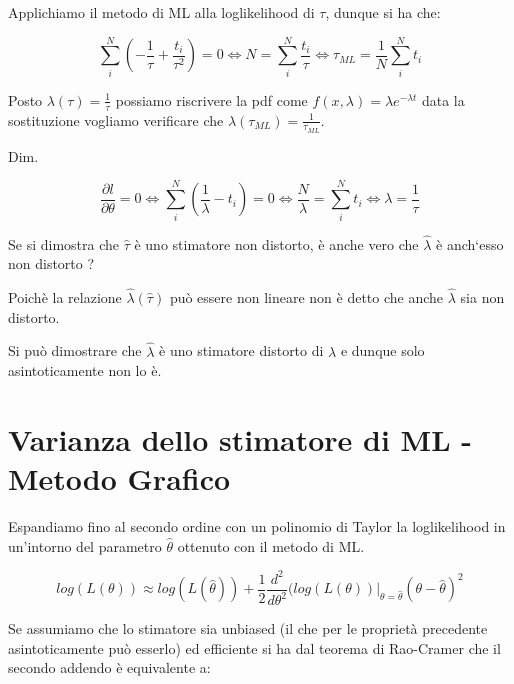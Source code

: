 \noindent Applichiamo il metodo di ML alla loglikelihood di $\tau$, dunque si ha che:

\begin{equation*}
		\sum_{i}^N(-\frac{1}{\tau}+ \frac{t_{i}}{\tau^2}) = 0 \iff N = \sum_{i}^N \frac{t_{i}}{\tau} \iff \tau_{ML} = \frac{1}{N} \sum_{i}^Nt_{i}
\end{equation*}

\noindent Posto $\lambda(\tau) = \frac{1}{\tau}$ possiamo riscrivere la pdf come $f(x,\lambda)= \lambda e^{-\lambda t}$ data la sostituzione vogliamo verificare che $\lambda(\tau_{ML}) = \frac{1}{\tau_{ML}}$.\newline


\noindent Dim.

\begin{equation*}
		\frac{\partial l}{\partial \theta} = 0 \iff \sum_{i}^N(\frac{1}{\lambda} - t_{i}) = 0 \iff \frac{N}{\lambda} = \sum_{i}^N t_{i} \iff \lambda = \frac{1}{\tau}
\end{equation*}

\noindent Se si dimostra che $\hat{\tau}$ \`{e} uno stimatore non distorto, \`{e} anche vero che $\hat{\lambda}$ \`{e} anch`esso non distorto ? \newline

Poich\`{e} la relazione $\hat{\lambda}(\hat{\tau})$ pu\`{o} essere non lineare non \`{e} detto che anche $\hat{\lambda}$ sia non distorto. 

\noindent Si pu\`{o} dimostrare che $\hat{\lambda}$ \`{e} uno stimatore distorto di $\lambda$ e dunque solo asintoticamente non lo \`{e}.

\section{Varianza dello stimatore di ML - Metodo Grafico}

Espandiamo fino al secondo ordine con un polinomio di Taylor la loglikelihood in un'intorno del parametro $\hat{\theta}$ ottenuto con il metodo di ML.

\begin{equation}
	log(L(\theta)) \approx log(L(\hat{\theta})) + \frac{1}{2}\frac{d^2}{d\theta^2}(log(L(\theta))\vert_{\theta = \hat{\theta}} (\theta - \hat{\theta})^2
\end{equation}

\noindent Se assumiamo che lo stimatore sia unbiased (il che per le propriet\`{a} precedente asintoticamente pu\`{o} esserlo) ed efficiente si ha dal teorema di Rao-Cramer che il secondo addendo \`{e} equivalente a:


